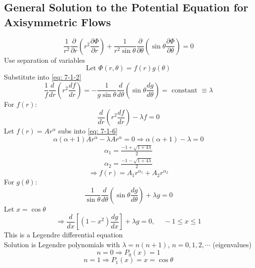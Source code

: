 \subsection{General Solution to the Potential Equation for Axisymmetric Flows}
\[
\frac{1}{r^2}\frac{\partial}{\partial r}\left(r^2\frac{\partial\Phi}{\partial r}\right) + \frac{1}{r^2\sin\theta}\frac{\partial}{\partial\theta}\left(\sin\theta\frac{\partial\Phi}{\partial\theta}\right) = 0
\]
Use separation of variables
\begin{equation}
\text{Let }\Phi(r,\theta)=f(r)g(\theta)\label{eq: 7-1-5}
\end{equation}
Substitute into \eqref{eq: 7-1-2} 
\[
\frac{1}{f}\frac{d}{dr}\left(r^2\frac{df}{dr}\right) = -\frac{1}{g\sin\theta}\frac{d}{d\theta}\left(\sin\theta\frac{dg}{d\theta}\right)=\text{ constant }\equiv\lambda
\]
For $f(r)\colon$
\begin{equation}
\frac{d}{dr}\left(r^2\frac{df}{dr}\right)-\lambda  f = 0\label{eq: 7-1-6}
\end{equation}
Let $f(r)=Ar^\alpha$ subs into \eqref{eq: 7-1-6}
\[
\alpha\left(\alpha+1\right)Ar^\alpha - \lambda Ar^\alpha = 0\Longrightarrow\alpha\left(\alpha+1\right) -\lambda = 0
\]
\begin{subequations}
\label{eq: 7-1-7}
\begin{align}
\alpha_1 = \frac{-1+\sqrt{1+4\lambda}}{2} \label{eq: 7-1-7a}\\
\alpha_2 = \frac{-1-\sqrt{1+4\lambda}}{2}\label{eq: 7-1-7b}
\end{align}
\end{subequations}
\begin{equation}
\Longrightarrow f(r) = A_1r^{\alpha_1} + A_2r^{\alpha_2}
\label{eq: 7-1-8}
\end{equation}
For $g(\theta)\colon$
\begin{equation}
\frac{1}{\sin\theta}\frac{d}{d\theta}\left(\sin\theta\frac{dg}{d\theta}\right) + \lambda g = 0
\label{eq: 7-1-9}
\end{equation}
Let $x=\cos\theta$
\begin{equation}
\Longrightarrow \frac{d}{dx}\left[\left(1-x^2\right)\frac{dg}{dx}\right] + \lambda g = 0,\phantom{-}-1\leq x\leq 1
\end{equation}
This is a Legendre differential equation\\
Solution is Legendre polynomials with $\lambda = n\left(n+1\right)$, $n=0,1,2,\cdots$ (eigenvalues)\\
\[
n=0\Longrightarrow P_0(x)=1
\]
\[
n=1\Longrightarrow P_1(x)=x=\cos\theta
\]

